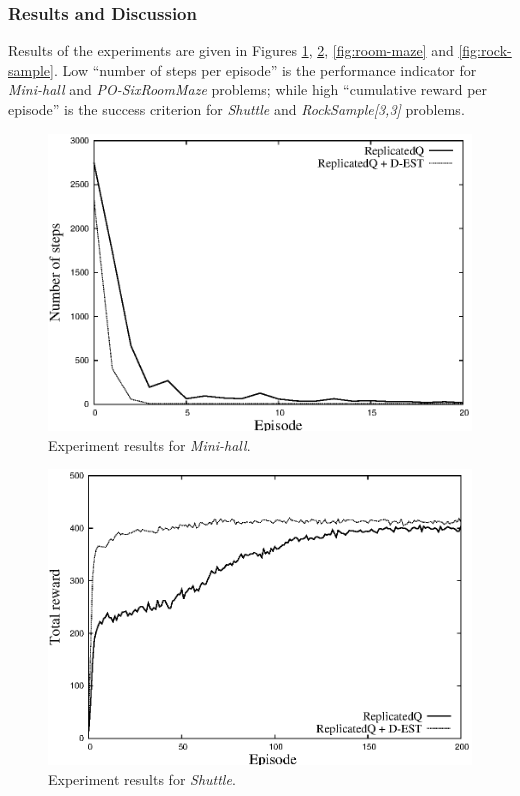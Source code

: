\documentclass[10pt, conference, compsocconf]{IEEEtran}
\begin{document}
\subsubsection{Results and Discussion}
\label{sec:experimental_results}

Results of the experiments are given in Figures \ref{fig:mini-hall}, \ref{fig:shuttle}, \ref{fig:room-maze} and \ref{fig:rock-sample}. Low ``number of steps per episode'' is the performance indicator for \textit{Mini-hall} and \textit{PO-SixRoomMaze} problems; while high ``cumulative reward per episode'' is the success criterion for \textit{Shuttle} and \textit{RockSample[3,3]} problems.


\begin{figure}[t]
\centering
\includegraphics[width=\columnwidth]{results-mini-hall}
\caption{Experiment results for \textit{Mini-hall}.}
\label{fig:mini-hall}
\end{figure}


\begin{figure}[t]
\centering
\includegraphics[width=\columnwidth]{results-shuttle}
\caption{Experiment results for \textit{Shuttle}.}
\label{fig:shuttle}
\end{figure}
\end{document}
